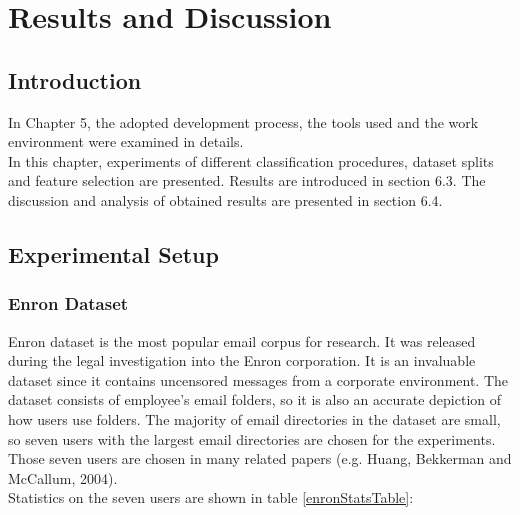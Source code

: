 
\chapter{Results and Discussion} %

\label{Chapter6} %



\section{Introduction}
In Chapter 5, the adopted development process, the tools used and the work environment were examined in details. \\
In this chapter, experiments of different classification procedures, dataset splits and feature selection are presented. Results are introduced in section 6.3. The discussion and analysis of obtained results are presented in section 6.4.


\section{Experimental Setup}

\subsection{Enron Dataset \cite{ENRON}}
Enron dataset is the most popular email corpus for research. It was released during the legal investigation into the Enron corporation.
It is an invaluable dataset since it contains uncensored messages from a corporate environment. The dataset consists of employee’s email folders, so it is also an accurate depiction of how users use folders. The majority of email directories in the dataset are small, so seven users with the largest email directories are chosen for the experiments. Those seven users are chosen in many related papers (e.g. Huang, Bekkerman and McCallum, 2004\cite{RON04}). \\Statistics on the seven users are shown in table \ref{enronStatsTable}:

